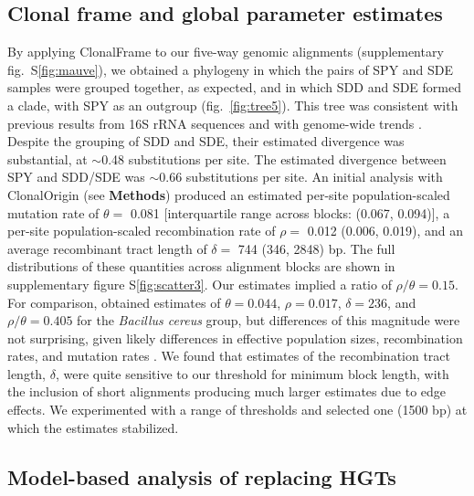 \documentclass[12pt]{article}
\begin{document}
\subsection*{Clonal frame and global parameter estimates}
By applying ClonalFrame to our five-way genomic alignments 
(supplementary fig.\ S\ref{fig:mauve}), we obtained a
phylogeny in which the pairs of SPY and SDE samples were grouped together,
as expected, and in which SDD and SDE formed a clade, with SPY as an
outgroup (fig.\ \ref{fig:tree5}).  This tree was consistent with previous
results from 16S rRNA sequences \citep{Facklam2002} and with genome-wide
trends \citep{Suzuki2011}.  Despite the grouping of SDD and SDE, their
estimated divergence was substantial, at $\sim$0.48 substitutions per site.  
The estimated divergence between SPY and SDD/SDE was $\sim$0.66
substitutions per site.  
An initial analysis with ClonalOrigin (see \textbf{Methods}) produced an
estimated
per-site population-scaled mutation rate of $\theta = $ 0.081
[interquartile range across blocks: (0.067, 0.094)], a per-site
population-scaled recombination rate of $\rho = $ 0.012 (0.006, 0.019), and
an average recombinant tract length of $\delta = $ 744 (346, 2848) bp.  The
full distributions of these quantities across alignment blocks are shown in
supplementary
figure S\ref{fig:scatter3}.  Our estimates implied a ratio of $\rho/\theta
= 0.15$.  For comparison, \cite{Didelot2010} obtained estimates of $\theta
= 0.044$, $\rho = 0.017$, $\delta = 236$, and $\rho/\theta = 0.405$ for the
{\em Bacillus cereus} group, but differences of this magnitude were not
surprising, given likely differences in effective population sizes,
recombination rates, and mutation rates \citep[e.g.,][]{Feil2001}.  We
found that estimates of the recombination tract length, $\delta$, were
quite sensitive to our threshold for minimum block length, with the
inclusion of short alignments producing much larger estimates due to edge
effects.  We experimented with a range of thresholds and selected one (1500
bp) at which the estimates stabilized.

\subsection*{Model-based analysis of replacing HGTs}
\end{document}
